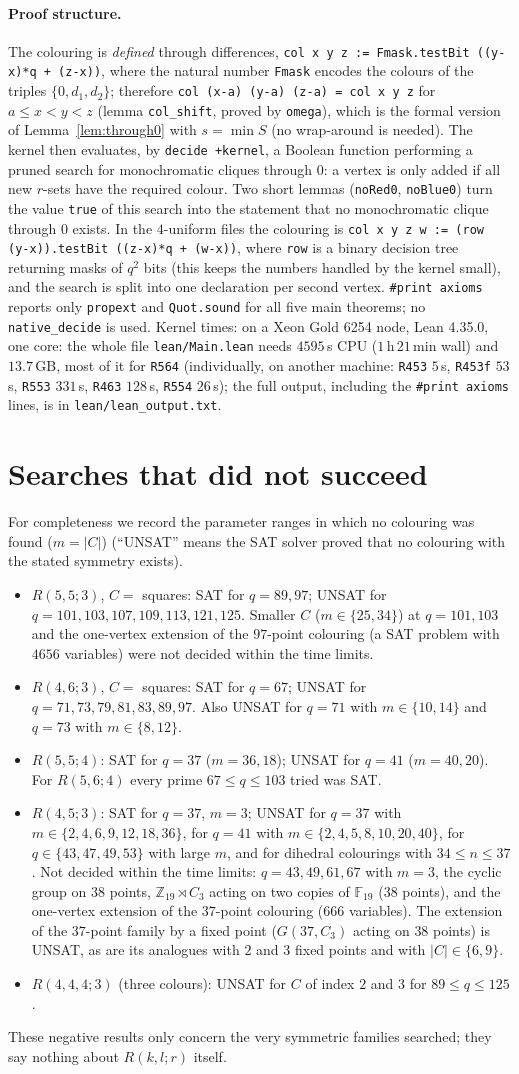 \documentclass[11pt]{article}
\theoremstyle{definition}
\theoremstyle{remark}
\newcommand{\F}{\mathbb F}
\newcommand{\RLeanTimes}{on a Xeon Gold 6254 node, Lean 4.35.0, one core:
the whole file \texttt{lean/Main.lean} needs $4595$\,s CPU ($1$\,h\,$21$\,min wall) and $13.7$\,GB, most of it
for \texttt{R564} (individually, on another machine: \texttt{R453} $5$\,s, \texttt{R453f} $53$\,s,
\texttt{R553} $331$\,s, \texttt{R463} $128$\,s, \texttt{R554} $26$\,s); the full output, including the
\texttt{\#print axioms} lines, is in \texttt{lean/lean\_output.txt}}
\newcommand{\RSweepFive}{Smaller $C$ ($m\in\{25,34\}$) at $q=101,103$ and the one-vertex extension of the $97$-point colouring (a SAT problem with $4656$ variables) were not decided within the time limits.}
\newcommand{\RSweepFourFive}{Not decided within the time limits: $q=43,49,61,67$ with $m=3$, the cyclic group on $38$ points, $\mathbb Z_{19}\rtimes C_3$ acting on two copies of $\F_{19}$ ($38$ points), and the one-vertex extension of the $37$-point colouring ($666$ variables). The extension of the $37$-point family by a fixed point ($G(37,C_3)$ acting on $38$ points) is UNSAT, as are its analogues with $2$ and $3$ fixed points and with $|C|\in\{6,9\}$.}
\newcommand{\RSweepFourSix}{Also UNSAT for $q=71$ with $m\in\{10,14\}$ and $q=73$ with $m\in\{8,12\}$.}
\newcommand{\RSweepFFour}{For $R(5,6;4)$ every prime $67\le q\le 103$ tried was SAT.}
\begin{document}
\paragraph{Proof structure.} The colouring is \emph{defined} through differences,
\texttt{col x y z := Fmask.testBit ((y-x)*q + (z-x))}, where the natural number \texttt{Fmask} encodes the
colours of the triples $\{0,d_1,d_2\}$; therefore \texttt{col (x-a) (y-a) (z-a) = col x y z} for
$a\le x<y<z$ (lemma \texttt{col\_shift}, proved by \texttt{omega}), which is the formal version of
Lemma~\ref{lem:through0} with $s=\min S$ (no wrap-around is needed). The kernel then evaluates, by
\texttt{decide +kernel}, a Boolean function performing a pruned search for monochromatic cliques through
$0$: a vertex is only added if all new $r$-sets have the required colour. Two short lemmas
(\texttt{noRed0}, \texttt{noBlue0}) turn the value \texttt{true} of this search into the statement that no
monochromatic clique through $0$ exists. In the $4$-uniform files the colouring is
\texttt{col x y z w := (row (y-x)).testBit ((z-x)*q + (w-x))}, where \texttt{row} is a binary decision
tree returning masks of $q^2$ bits (this keeps the numbers handled by the kernel small), and the search is
split into one declaration per second vertex. \texttt{\#print axioms} reports only \texttt{propext} and
\texttt{Quot.sound} for all five main theorems; no \texttt{native\_decide} is used. Kernel times: \RLeanTimes.

\section{Searches that did not succeed}\label{sec:search}
For completeness we record the parameter ranges in which no colouring was found ($m=|C|$) (``UNSAT'' means the
SAT solver proved that no colouring with the stated symmetry exists).
\begin{itemize}
\item $R(5,5;3)$, $C=$ squares: SAT for $q=89, 97$; UNSAT for $q=101,103,107,109,113,121,125$.
\RSweepFive
\item $R(4,6;3)$, $C=$ squares: SAT for $q=67$; UNSAT for $q=71,73,79,81,83,89,97$. \RSweepFourSix
\item $R(5,5;4)$: SAT for $q=37$ ($m=36,18$); UNSAT for $q=41$ ($m=40,20$). \RSweepFFour
\item $R(4,5;3)$: SAT for $q=37$, $m=3$; UNSAT for $q=37$ with $m\in\{2,4,6,9,12,18,36\}$, for
  $q=41$ with $m\in\{2,4,5,8,10,20,40\}$, for $q\in\{43,47,49,53\}$ with large $m$, and for dihedral
  colourings with $34\le n\le 37$. \RSweepFourFive
\item $R(4,4,4;3)$ (three colours): UNSAT for $C$ of index $2$ and $3$ for $89\le q\le 125$.
\end{itemize}
These negative results only concern the very symmetric families searched; they say nothing about
$R(k,l;r)$ itself.
\end{document}
